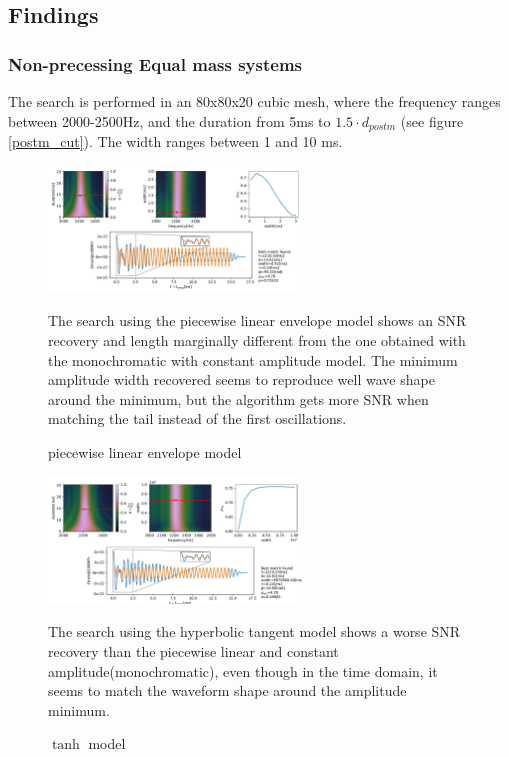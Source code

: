 \newpage

\subsection*{Findings}



\subsubsection*{Non-precessing Equal mass systems}
The search is performed in an 80x80x20 cubic mesh, where the frequency ranges between 2000-2500Hz, and the duration from 5ms to $1.5\cdot d_{postm}$ (see figure \ref{postm_cut}). The width ranges between 1 and 10 ms.




\begin{figure}[hbt!]
\begin{center}
\includegraphics[width=0.6\textwidth, angle=0]{images/Data_analysis/results/envel_35_lin.pdf}
\caption{piecewise linear envelope model}
\end{center}
The search using the piecewise linear envelope model shows an SNR recovery and length marginally different from the one obtained with the monochromatic with constant amplitude model. The minimum amplitude width recovered seems to reproduce well wave shape around the minimum, but the algorithm gets more SNR when matching the tail instead of the first oscillations. 
\end{figure}

\begin{figure}[hbt!]
\begin{center}
\includegraphics[width=0.6\textwidth, angle=0]{images/Data_analysis/results/envel_35_tanh.pdf}
\caption{$\tanh$ model}
\end{center}
The search using the hyperbolic tangent model shows a worse SNR recovery than the piecewise linear and constant amplitude(monochromatic), even though in the time domain, it seems to match the waveform shape around the amplitude minimum. 
\end{figure}

